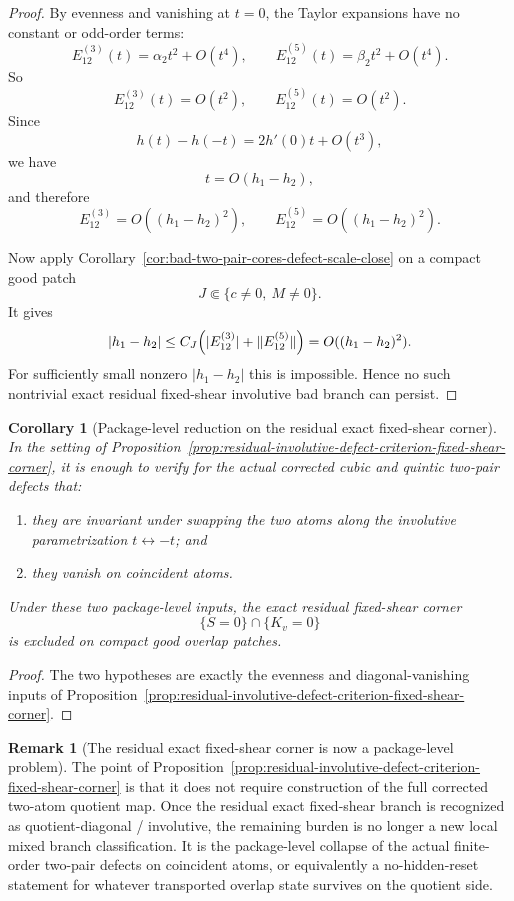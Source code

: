 \documentclass[11pt,a4paper]{amsart}
\theoremstyle{plain}
\newtheorem{corollary}[theorem]{Corollary}
\theoremstyle{definition}
\newtheorem{remark}[theorem]{Remark}
\begin{document}
\begin{proof}
By evenness and vanishing at $t=0$, the Taylor expansions have no constant or
odd-order terms:
\[
E_{12}^{(3)}(t)=\alpha_2 t^2+O(t^4),
\qquad
E_{12}^{(5)}(t)=\beta_2 t^2+O(t^4).
\]
So
\[
E_{12}^{(3)}(t)=O(t^2),
\qquad
E_{12}^{(5)}(t)=O(t^2).
\]
Since
\[
h(t)-h(-t)=2h'(0)t+O(t^3),
\]
we have
\[
t=O(h_1-h_2),
\]
and therefore
\[
E_{12}^{(3)}=O((h_1-h_2)^2),
\qquad
E_{12}^{(5)}=O((h_1-h_2)^2).
\]

Now apply Corollary~\ref{cor:bad-two-pair-cores-defect-scale-close} on a
compact good patch
\[
J\Subset\{c\neq 0,\ M\neq 0\}.
\]
It gives
\[
|h_1-h_2|
\le
C_J\Bigl(|E_{12}^{(3)}|+\|E_{12}^{(5)}\|\Bigr)
=
O((h_1-h_2)^2).
\]
For sufficiently small nonzero $|h_1-h_2|$ this is impossible. Hence no such
nontrivial exact residual fixed-shear involutive bad branch can persist.
\end{proof}

\begin{corollary}[Package-level reduction on the residual exact fixed-shear corner]
\label{cor:package-level-reduction-residual-fixed-shear-corner}
In the setting of
Proposition~\ref{prop:residual-involutive-defect-criterion-fixed-shear-corner},
it is enough to verify for the actual corrected cubic and quintic two-pair
defects that:

\begin{enumerate}
\item they are invariant under swapping the two atoms along the involutive
parametrization $t\leftrightarrow -t$; and

\item they vanish on coincident atoms.
\end{enumerate}

Under these two package-level inputs, the exact residual fixed-shear corner
\[
\{S=0\}\cap\{K_v=0\}
\]
is excluded on compact good overlap patches.
\end{corollary}

\begin{proof}
The two hypotheses are exactly the evenness and diagonal-vanishing inputs of
Proposition~\ref{prop:residual-involutive-defect-criterion-fixed-shear-corner}.
\end{proof}

\begin{remark}[The residual exact fixed-shear corner is now a package-level problem]
\label{rem:residual-fixed-shear-corner-now-package-level}
The point of
Proposition~\ref{prop:residual-involutive-defect-criterion-fixed-shear-corner}
is that it does not require construction of the full corrected two-atom quotient
map. Once the residual exact fixed-shear branch is recognized as
quotient-diagonal / involutive, the remaining burden is no longer a new local
mixed branch classification. It is the package-level collapse of the actual
finite-order two-pair defects on coincident atoms, or equivalently a
no-hidden-reset statement for whatever transported overlap state survives on the
quotient side.
\end{remark}
\end{document}
